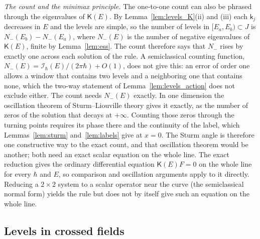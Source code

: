\documentclass[aps,prd,onecolumn,tightenlines,nofootinbib,notitlepage,11pt,floatfix]{revtex4-2}
\theoremstyle{indentedtheorem}
\begin{document}
\emph{The count and the minimax principle.} The one-to-one count can also be phrased through the eigenvalues of $\mathsf{K}(E)$. By Lemma~\ref{lem:levels_K}(ii) and (iii) each $\mathsf{k}_j$ decreases in $E$ and the levels are simple, so the number of levels in $[E_a,E_b)\subset J$ is $N_-(E_b)-N_-(E_a)$, where $N_-(E)$ is the number of negative eigenvalues of $\mathsf{K}(E)$, finite by Lemma~\ref{lem:ess}. The count therefore says that $N_-$ rises by exactly one across each solution of the rule. A semiclassical counting function, $N_-(E)=\mathcal{I}_\hbar(E)/(2\pi\hbar)+O(1)$, does not give this: an error of order one allows a window that contains two levels and a neighboring one that contains none, which the two-way statement of Lemma~\ref{lem:levels_action} does not exclude either. The count needs $N_-(E)$ exactly. In one dimension the oscillation theorem of Sturm--Liouville theory gives it exactly, as the number of zeros of the solution that decays at $+\infty$. Counting those zeros through the turning points requires its phase there and the continuity of the label, which Lemmas~\ref{lem:sturm} and~\ref{lem:labels} give at $x=0$. The Sturm angle is therefore one constructive way to the exact count, and that oscillation theorem would be another; both need an exact scalar equation on the whole line. The exact reduction gives the ordinary differential equation $\mathsf{K}(E)F=0$ on the whole line for every $\hbar$ and $E$, so comparison and oscillation arguments apply to it directly. Reducing a $2\times2$ system to a scalar operator near the curve (the semiclassical normal form) yields the rule but does not by itself give such an equation on the whole line.

\subsection{Levels in crossed fields}
\label{sup:proof_levels_crossed}
\end{document}
